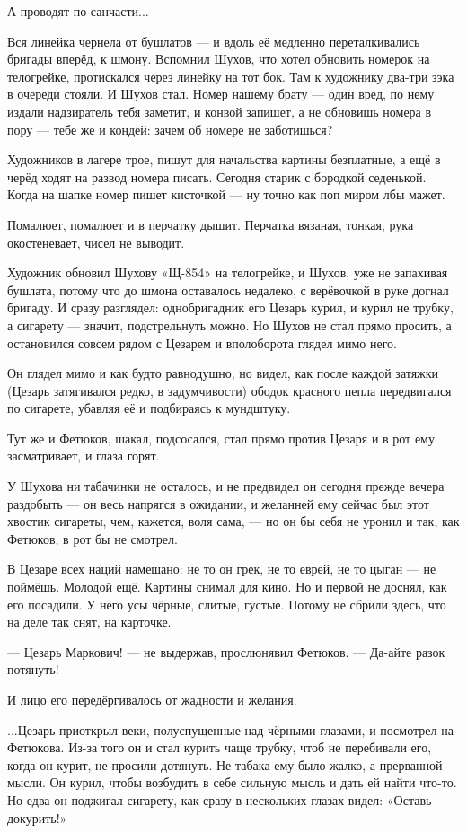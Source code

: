 А проводят по санчасти...

Вся линейка чернела от бушлатов --- и вдоль её медленно переталкивались бригады вперёд, к
шмону. Вспомнил Шухов, что хотел обновить номерок на телогрейке, протискался через линейку
на тот бок. Там к художнику два-три зэка в очереди стояли. И Шухов стал. Номер нашему брату ---
один вред, по нему издали надзиратель тебя заметит, и конвой запишет, а не обновишь номера в
пору --- тебе же и кондей: зачем об номере не заботишься?

Художников в лагере трое, пишут для начальства картины безплатные, а ещё в черёд ходят на
развод номера писать. Сегодня старик с бородкой седенькой. Когда на шапке номер пишет
кисточкой --- ну точно как поп миром лбы мажет.

Помалюет, помалюет и в перчатку дышит. Перчатка вязаная, тонкая, рука окостеневает, чисел не
выводит.

Художник обновил Шухову «Щ-854» на телогрейке, и Шухов, уже не запахивая бушлата, потому что до
шмона оставалось недалеко, с верёвочкой в руке догнал бригаду. И сразу разглядел:
однобригадник его Цезарь курил, и курил не трубку, а сигарету --- значит, подстрельнуть можно.
Но Шухов не стал прямо просить, а остановился совсем рядом с Цезарем и вполоборота глядел
мимо него.

Он глядел мимо и как будто равнодушно, но видел, как после каждой затяжки (Цезарь затягивался
редко, в задумчивости) ободок красного пепла передвигался по сигарете, убавляя её и
подбираясь к мундштуку.

Тут же и Фетюков, шакал, подсосался, стал прямо против Цезаря и в рот ему засматривает, и
глаза горят.

У Шухова ни табачинки не осталось, и не предвидел он сегодня прежде вечера раздобыть --- он
весь напрягся в ожидании, и желанней ему сейчас был этот хвостик сигареты, чем, кажется, воля
сама, --- но он бы себя не уронил и так, как Фетюков, в рот бы не смотрел.

В Цезаре всех наций намешано: не то он грек, не то еврей, не то цыган --- не поймёшь. Молодой ещё.
Картины снимал для кино. Но и первой не доснял, как его посадили. У него усы чёрные, слитые,
густые. Потому не сбрили здесь, что на деле так снят, на карточке.

--- Цезарь Маркович! --- не выдержав, прослюнявил Фетюков. --- Да-айте разок потянуть!

И лицо его передёргивалось от жадности и желания.

...Цезарь приоткрыл веки, полуспущенные над чёрными глазами, и посмотрел на Фетюкова. Из-за
того он и стал курить чаще трубку, чтоб не перебивали его, когда он курит, не просили
дотянуть. Не табака ему было жалко, а прерванной мысли. Он курил, чтобы возбудить в себе
сильную мысль и дать ей найти что-то. Но едва он поджигал сигарету, как сразу в нескольких
глазах видел: «Оставь докурить!»

